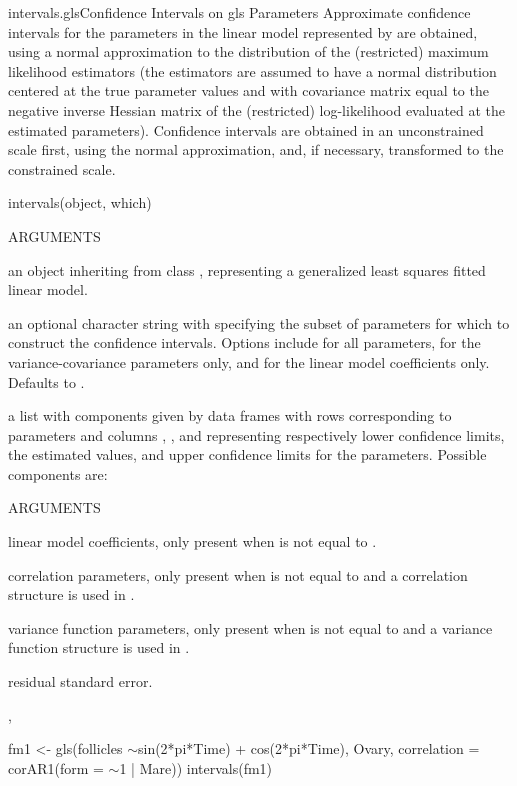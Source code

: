 \documentclass[pdftex]{article} \usepackage{url,graphicx}
\renewcommand{\Twiddle}{\mbox{\(\sim\)}}
\begin{document}
\begin{Helpfile}{intervals.gls}{Confidence Intervals on gls Parameters}
Approximate confidence intervals for the parameters in the linear
model represented by  are obtained, using
a normal approximation to the distribution of the (restricted)
maximum likelihood estimators (the estimators are assumed to have a
normal distribution centered at the true parameter values and with
covariance matrix equal to the negative inverse Hessian matrix of the
(restricted) log-likelihood evaluated at the estimated parameters).
Confidence intervals are obtained in an unconstrained scale first,
using the normal approximation, and, if necessary, transformed to the
constrained scale.
\begin{Example}
intervals(object, which)
\end{Example}
\begin{Argument}{ARGUMENTS}
\item[\Co{object:}]
an object inheriting from class , representing
a generalized least squares fitted linear model.
\item[\Co{which:}]
an optional character string with specifying the  subset
of parameters for which to construct the confidence
intervals. Options include  for all parameters,
 for the variance-covariance parameters only, and
 for the linear model coefficients  only. Defaults to
.
\end{Argument}
a list with components given by data frames with rows corresponding to
parameters and columns , , and 
representing respectively lower confidence limits, the estimated
values, and upper confidence limits for the parameters. Possible
components are:
\begin{Argument}{ARGUMENTS}
\item[\Co{coef:}]
linear model coefficients, only present when 
is not equal to .
\item[\Co{corStruct:}]
correlation parameters, only present when
 is not equal to  and a 
correlation structure is used in .
\item[\Co{varFunc:}]
variance function parameters, only present when
 is not equal to  and a variance function
structure is used in .
\item[\Co{sigma:}]
residual standard error.
\end{Argument}
, 
\need 15pt
\vspace{-16pt} 
\begin{Example}
fm1 <- gls(follicles \Twiddle sin(2*pi*Time) + cos(2*pi*Time), Ovary,
           correlation = corAR1(form = \Twiddle  1 | Mare))
intervals(fm1)
\end{Example}
\end{Helpfile}
\end{document}
